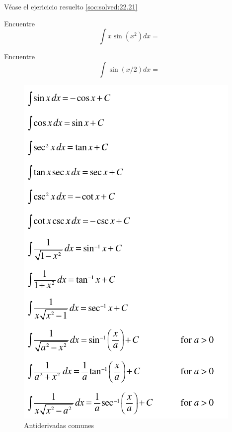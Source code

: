  Véase el ejericicio resuelto \ref{soc:solved:22.21}



 \begin{problema}
  \label{soc:exmp:22.7.a}
  Encuentre $$\int x \sin(x^{2})dx=$$
 \end{problema}




 \begin{problema}
  \label{soc:exmp:22.7.b}
  Encuentre $$\int  \sin(x/2)dx=$$
 \end{problema}



 
  \begin{figure}
 \centering
 \includegraphics[height=.8\textheight]{./calculo/antiderivadas.png}
 \caption{Antiderivadas comunes}
 \label{fig:antiderivadas}
\end{figure}

 


